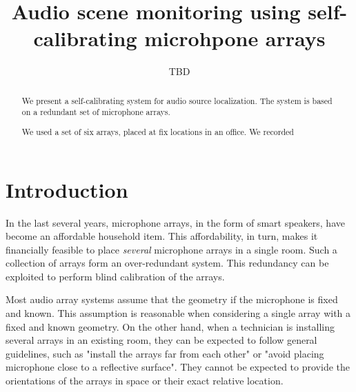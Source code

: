 \documentclass[journal]{IEEEtran}
\begin{document}
\title{Audio scene monitoring using self-calibrating microhpone arrays}

\author{TBD} %

\maketitle

\begin{abstract}
We present a self-calibrating system for audio source localization. The system is based on a redundant set of microphone arrays. 

We used a set of six arrays, placed at fix locations in an office. We recorded 



 \end{abstract}

\section{Introduction}
In the last several years, microphone arrays, in the form of smart speakers, have become an affordable household item. This affordability, in turn, makes it financially feasible to  place {\em several} microphone arrays in a single room.
Such a collection of arrays form an over-redundant system. This redundancy can be exploited to perform blind calibration of the arrays.

Most audio array systems assume that the geometry if the microphone is fixed and known. This assumption is reasonable when considering a single array with a fixed and known geometry. On the other hand, when a technician is installing several arrays 
in an existing room, they can be expected to follow general guidelines, such as "install the arrays far from each other" or "avoid placing microphone close to a reflective surface". They cannot be expected to provide the orientations of the arrays in space or their exact relative location.
\end{document}
